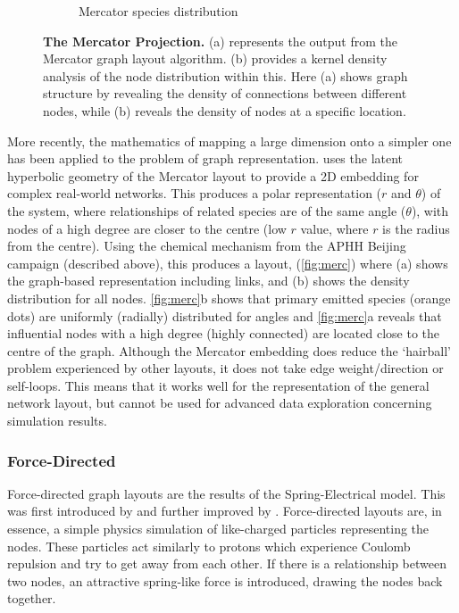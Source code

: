 \begin{figure}[H]
\begin{subfigure}[b]{.495\textwidth}
     \caption{Mercator species distribution}
     \end{subfigure}
        \caption{\textbf{The Mercator Projection.} (a) represents the output from the Mercator graph layout algorithm. (b) provides a kernel density analysis of the node distribution within this. Here (a) shows graph structure by revealing the density of connections between different nodes, while (b) reveals the density of nodes at a specific location. }
        \label{fig:merc}
\end{figure}

More recently, the mathematics of mapping a large dimension onto a simpler one has been applied to the problem of graph representation. \citep{mercgraph} uses the latent hyperbolic geometry of the Mercator layout to provide a 2D embedding for complex real-world networks. This produces a polar representation ($r$ and $\theta$) of the system, where relationships of related species are of the same angle ($\theta$), with nodes of a high degree are closer to the centre (low $r$ value, where $r$ is the radius from the centre). Using the chemical mechanism from the APHH  Beijing campaign (described above), this produces a layout, (\autoref{fig:merc}) where (a) shows the graph-based representation including links, and (b) shows the density distribution for all nodes. \autoref{fig:merc}b shows that primary emitted species (orange dots) are uniformly (radially) distributed for angles and \autoref{fig:merc}a reveals that influential nodes with a high degree (highly connected) are located close to the centre of the graph. Although the Mercator embedding does reduce the `hairball' problem experienced by other layouts, it does not take edge weight/direction or self-loops. This means that it works well for the representation of the general network layout, but cannot be used for advanced data exploration concerning simulation results.



\subsubsection{Force-Directed}\label{sec:forcedirected}

Force-directed graph layouts are the results of the Spring-Electrical model. This was first introduced by \citep{Eades} and further improved by \citep{raingold}. Force-directed layouts are, in essence, a simple physics simulation of like-charged particles representing the nodes. These particles act similarly to protons which experience Coulomb repulsion and try to get away from each other. If there is a relationship between two nodes, an attractive spring-like force is introduced, drawing the nodes back together.

